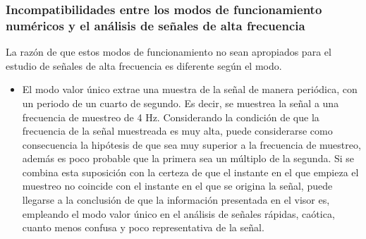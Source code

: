 \subsubsection[Modos numéricos y señales de alta
frecuencia]{Incompatibilidades entre los modos de funcionamiento numéricos
y el análisis de señales de alta frecuencia}

La razón de que estos modos de funcionamiento no sean apropiados para el
estudio de señales de alta frecuencia es diferente según el modo.

\begin{itemize}
	\item El modo valor único extrae una muestra de la señal de manera
		periódica, con un periodo de un cuarto de segundo. Es
		decir, se muestrea la señal a una frecuencia de muestreo de
		4 Hz. Considerando la condición de que la frecuencia de la
		señal muestreada es muy alta, puede considerarse como
		consecuencia la hipótesis de que sea muy superior a la
		frecuencia de muestreo, además es poco probable que la
		primera sea un múltiplo de la segunda. Si se combina esta
		suposición con la certeza de que el instante en el que
		empieza el muestreo no coincide con el instante en el que
		se origina la señal, puede llegarse a la conclusión de que
		la información presentada en el visor es, empleando el modo
		valor único en el análisis de señales rápidas, caótica,
		cuanto menos confusa y poco representativa de la señal.

\end{itemize}
